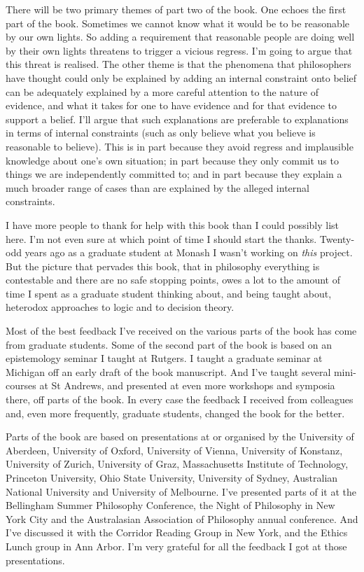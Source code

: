 \documentclass[
  10pt,
  letterpaper,
  twoside]{scrbook}
\begin{document}
There will be two primary themes of part two of the book. One echoes the
first part of the book. Sometimes we cannot know what it would be to be
reasonable by our own lights. So adding a requirement that reasonable
people are doing well by their own lights threatens to trigger a vicious
regress. I'm going to argue that this threat is realised. The other
theme is that the phenomena that philosophers have thought could only be
explained by adding an internal constraint onto belief can be adequately
explained by a more careful attention to the nature of evidence, and
what it takes for one to have evidence and for that evidence to support
a belief. I'll argue that such explanations are preferable to
explanations in terms of internal constraints (such as only believe what
you believe is reasonable to believe). This is in part because they
avoid regress and implausible knowledge about one's own situation; in
part because they only commit us to things we are independently
committed to; and in part because they explain a much broader range of
cases than are explained by the alleged internal constraints.

I have more people to thank for help with this book than I could
possibly list here. I'm not even sure at which point of time I should
start the thanks. Twenty-odd years ago as a graduate student at Monash I
wasn't working on \emph{this} project. But the picture that pervades
this book, that in philosophy everything is contestable and there are no
safe stopping points, owes a lot to the amount of time I spent as a
graduate student thinking about, and being taught about, heterodox
approaches to logic and to decision theory.

Most of the best feedback I've received on the various parts of the book
has come from graduate students. Some of the second part of the book is
based on an epistemology seminar I taught at Rutgers. I taught a
graduate seminar at Michigan off an early draft of the book manuscript.
And I've taught several mini-courses at St Andrews, and presented at
even more workshops and symposia there, off parts of the book. In every
case the feedback I received from colleagues and, even more frequently,
graduate students, changed the book for the better.

Parts of the book are based on presentations at or organised by the
University of Aberdeen, University of Oxford, University of Vienna,
University of Konstanz, University of Zurich, University of Graz,
Massachusetts Institute of Technology, Princeton University, Ohio State
University, University of Sydney, Australian National University and
University of Melbourne. I've presented parts of it at the Bellingham
Summer Philosophy Conference, the Night of Philosophy in New York City
and the Australasian Association of Philosophy annual conference. And
I've discussed it with the Corridor Reading Group in New York, and the
Ethics Lunch group in Ann Arbor. I'm very grateful for all the feedback
I got at those presentations.
\end{document}
